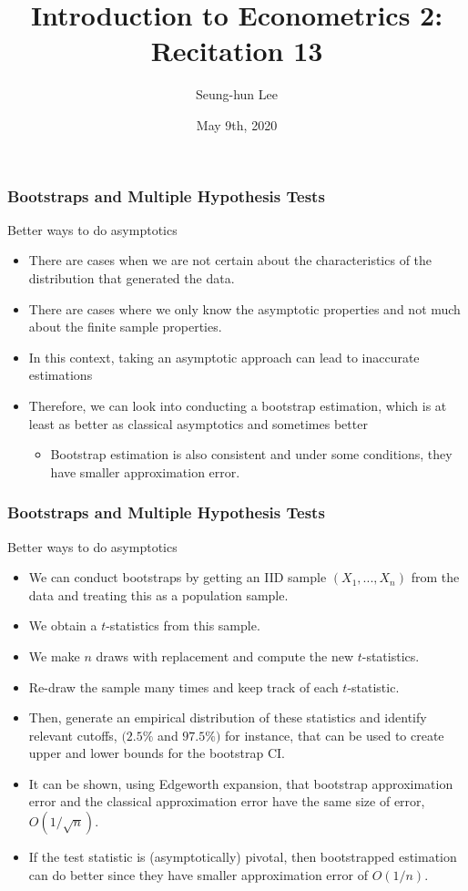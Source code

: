 \documentclass{beamer}
\title[Econometrics 2]{Introduction to Econometrics 2: Recitation 13} %
\author{Seung-hun Lee}
\institute{Columbia University}
\date{May 9th, 2020}
\begin{document}
\begin{frame}
\titlepage
\end{frame}

\begin{frame}
\frametitle{Bootstraps and Multiple Hypothesis Tests}
Better ways to do asymptotics
\begin{itemize}
\item There are cases when we are not certain about the characteristics of the distribution that generated the data. 
\item There are cases where we only know the asymptotic properties and not much about the finite sample properties. 
\item In this context, taking an asymptotic approach can lead to inaccurate estimations
\item Therefore, we can look into conducting a bootstrap estimation, which is at least as better as classical asymptotics and sometimes better
\begin{itemize}
\item Bootstrap estimation is also consistent and under some conditions, they have smaller approximation error.
\end{itemize}
\end{itemize}
\end{frame}

\begin{frame}
\frametitle{Bootstraps and Multiple Hypothesis Tests}
Better ways to do asymptotics
\begin{itemize}
\item We can conduct bootstraps by getting an IID sample $(X_1,...,X_n)$ from the data and treating this as a population sample.
\item We obtain a $t$-statistics from this sample.
\item We make $n$ draws with replacement and compute the new $t$-statistics.
\item Re-draw the sample many times and keep track of each $t$-statistic.
\item Then, generate an empirical distribution of these statistics and identify relevant cutoffs, $(2.5\%$ and $97.5\%)$ for instance, that can be used to create upper and lower bounds for the bootstrap CI.
\item It can be shown, using Edgeworth expansion, that bootstrap approximation error and the classical approximation error have the same size of error, $O\left(1/\sqrt{n}\right)$.
\item If the test statistic is (asymptotically) pivotal, then bootstrapped estimation can do better since they have smaller approximation error of $O\left(1/n\right)$.
\end{itemize}
\end{frame}
\end{document}
